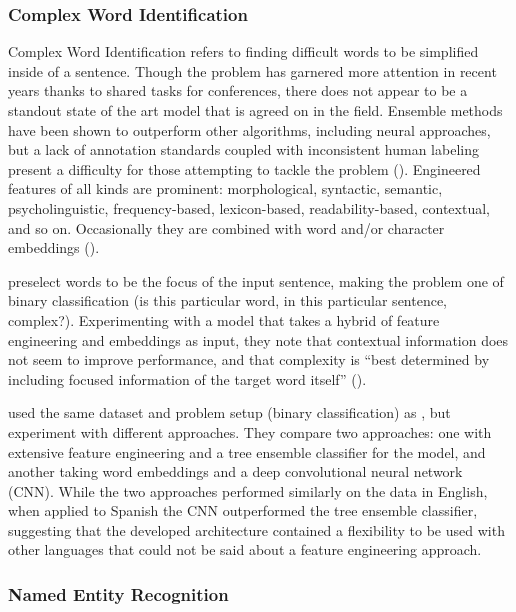 \subsubsection{Complex Word Identification} \label{cwi}

Complex Word Identification refers to finding difficult words to be simplified inside of a sentence. Though the problem has garnered more attention in recent years thanks to shared tasks for conferences, there does not appear to be a standout state of the art model that is agreed on in the field. Ensemble methods have been shown to outperform other algorithms, including neural approaches, but a lack of annotation standards coupled with inconsistent human labeling present a difficulty for those attempting to tackle the problem (\cite{dehertog2018deep}). Engineered features of all kinds are prominent: morphological, syntactic, semantic, psycholinguistic, frequency-based, lexicon-based, readability-based, contextual, and so on. Occasionally they are combined with word and/or character embeddings (\cite{aroyehun2018complex}).

\cite{dehertog2018deep} preselect words to be the focus of the input sentence, making the problem one of binary classification (is this particular word, in this particular sentence, complex?). Experimenting with a model that takes a hybrid of feature engineering and embeddings as input, they note that contextual information does not seem to improve performance, and that complexity is ``best determined by including focused information of the target word itself'' (\cite{dehertog2018deep}).

\cite{aroyehun2018complex} used the same dataset and problem setup (binary classification) as \cite{dehertog2018deep}, but experiment with different approaches. They compare two approaches: one with extensive feature engineering and a tree ensemble classifier for the model, and another taking word embeddings and a deep convolutional neural network (CNN). While the two approaches performed similarly on the data in English, when applied to Spanish the CNN outperformed the tree ensemble classifier, suggesting that the developed architecture contained a flexibility to be used with other languages that could not be said about a feature engineering approach.

\subsubsection{Named Entity Recognition}

